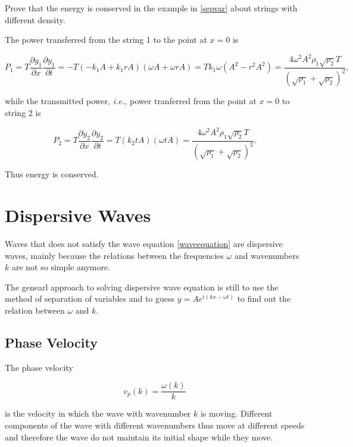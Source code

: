 \documentclass[a4paper,12pt]{report}
\begin{document}
{Prove that the energy is conserved in the example in \cref{sepvar} about strings with different density.}
{The power transferred from the string 1 to the point at \(x = 0\) is

\begin{equation}
	P_1  = T \frac{\partial y_1 }{\partial x}\frac{\partial y_1 }{\partial t} = -T(-k_1 A + k_1 rA)(\omega A+\omega rA) = Tk_1 \omega (A^2-r^2A^2) = \frac{4 \omega ^2A^2 \rho _{1} \sqrt{\rho _{2} }T }{(\sqrt{\rho _{1}}+\sqrt{\rho _{2} }  )^2}, 
\end{equation}

while the transmitted power, \textit{i.e.,} power tranferred from the point at \(x=0\) to string 2 is

\begin{equation}
	P_2  = T \frac{\partial y_2 }{\partial x}\frac{\partial y_2 }{\partial t} = T(k_2 tA)(\omega tA) =   \frac{4 \omega ^2A^2 \rho _{1} \sqrt{\rho _{2} }T }{(\sqrt{\rho _{1}}+\sqrt{\rho _{2} }  )^2}.
\end{equation}

Thus energy is conserved.

} 

\section{Dispersive Waves}

Waves that does not satisfy the wave equation \cref{waveequation} are dispersive waves, mainly because the relations between the frequencies \(\omega \) and wavenumbers \(k\) are not so simple anymore. 

The genearl approach to solving dispersive wave equation is still to use the method of separation of variables and to guess \(y = A e^{i (kx-\omega t)} \) to find out the relation between \(\omega \text { and } k\).   

\subsection{Phase Velocity}

The phase velocity 

\begin{equation}
	v_{p}(k) = \frac{\omega (k)}{k}  
\end{equation}

is the velocity in which the wave with wavenumber \(k\) is moving. Different components of the wave with different wavenumbers thus move at different speeds and therefore the wave do not maintain its initial shape while they move.
\end{document}

